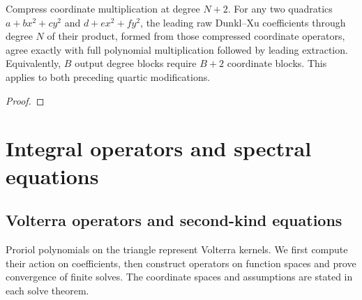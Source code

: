 \begin{theorem}
\label{thm:quadratic-product-padding}
\leanok
Compress coordinate multiplication at degree $N+2$. For any two quadratics
$a+bx^2+cy^2$ and $d+ex^2+fy^2$, the leading raw Dunkl--Xu coefficients through
degree $N$ of their product, formed from those compressed coordinate operators,
agree exactly with full polynomial multiplication followed by leading extraction.
Equivalently, $B$ output degree blocks require $B+2$ coordinate blocks.
This applies to both preceding quartic modifications.
\end{theorem}
\begin{proof}
\leanok
\end{proof}




\part{Integral operators and spectral equations}\label{part:integral-operators}
\chapter{Volterra operators and second-kind equations}\label{chap:volterra}
Proriol polynomials on the triangle represent Volterra kernels. We first
compute their action on coefficients, then construct operators on function
spaces and prove convergence of finite solves. The coordinate spaces and
assumptions are stated in each solve theorem.

